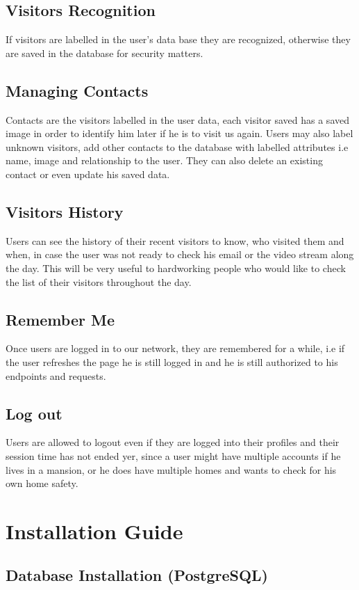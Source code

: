 \documentclass[a4 paper, 12pt]{article}
\begin{document}
\subsection{Visitors Recognition}
If visitors are labelled in the user's data base they are recognized, otherwise they are saved in the database for security matters.
\subsection{Managing Contacts}
Contacts are the visitors labelled in the user data, each visitor saved has a saved image in order to identify him later if he is to visit us again. Users may also label unknown visitors, add other contacts to the database with labelled attributes i.e name, image and relationship to the user. They can also delete an existing contact or even update his saved data.
\subsection{Visitors History}
Users can see the history of their recent visitors to know, who visited them and when, in case the user was not ready to check his email or the video stream along the day. This will be very useful to hardworking people who would like to check the list of their visitors throughout the day.
\subsection{Remember Me}
Once users are logged in to our network, they are remembered for a while, i.e if the user refreshes the page he is still logged in and he is still authorized to his endpoints and requests.
\subsection{Log out}
Users are allowed to logout even if they are logged into their profiles and their session time has not ended yer, since a user might have multiple accounts if he lives in a mansion, or he does have multiple homes and wants to check for his own home safety.
\section{Installation Guide}

\subsection{Database Installation (PostgreSQL)}
\end{document}
